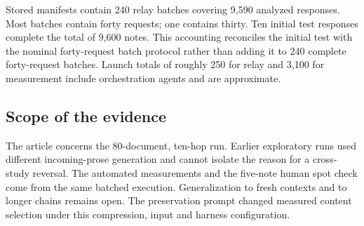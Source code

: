 \documentclass[10pt,letterpaper]{amsart}
\numberwithin{equation}{section}
\begin{document}
Stored manifests contain 240 relay batches covering 9,590 analyzed responses. Most batches
contain forty requests; one contains thirty. Ten initial test responses complete the total
of 9,600 notes. This accounting reconciles the initial test with the nominal forty-request
batch protocol rather than adding it to 240 complete forty-request batches. Launch totals
of roughly 250 for relay and 3,100 for measurement include orchestration agents and are
approximate.

\subsection*{Scope of the evidence}

The article concerns the 80-document, ten-hop run. Earlier exploratory runs used different
incoming-prose generation and cannot isolate the reason for a cross-study reversal. The
automated measurements and the five-note human spot check come from the same batched
execution. Generalization to fresh contexts and to longer chains remains open. The
preservation prompt changed measured content selection under this compression, input and
harness configuration.

\FloatBarrier


\end{document}
